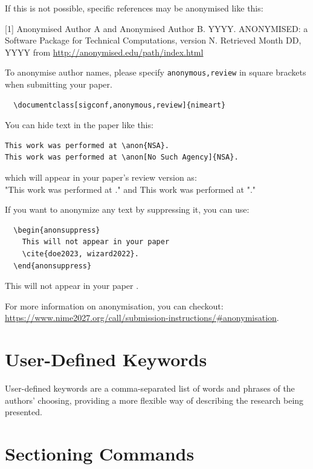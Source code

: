 \documentclass[sigconf]{nimeart}
\begin{document}
If this is not possible, specific references may be anonymised like this:

[1] Anonymised Author A and Anonymised Author B. YYYY. ANONYMISED: a Software Package for Technical Computations, version N. Retrieved Month DD, YYYY from \url{http://anonymised.edu/path/index.html}


To anonymise author names, please specify \verb|anonymous,review| in square brackets when submitting your paper.
\begin{verbatim}
  \documentclass[sigconf,anonymous,review]{nimeart}
\end{verbatim}

You can hide text in the paper like this:

\begin{verbatim}
This work was performed at \anon{NSA}.
This work was performed at \anon[No Such Agency]{NSA}.
\end{verbatim}
which will appear in your paper's review version as:\\
"This work was performed at ." and This work was performed at "."


If you want to anonymize any text by suppressing it, you can use:
\begin{verbatim}
  \begin{anonsuppress}
    This will not appear in your paper
    \cite{doe2023, wizard2022}.
  \end{anonsuppress}
\end{verbatim}
\begin{anonsuppress}
    This will not appear in your paper
    \cite{doe2023, wizard2022}.
\end{anonsuppress}

For more information on anonymisation, you can checkout:
\url{https://www.nime2027.org/call/submission-instructions/#anonymisation}.

\section{User-Defined Keywords}

User-defined keywords are a comma-separated list of words and phrases
of the authors' choosing, providing a more flexible way of describing
the research being presented.

\section{Sectioning Commands}
\end{document}
